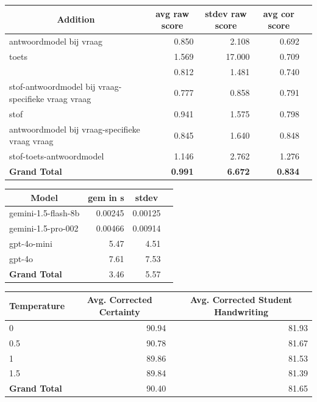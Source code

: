 \documentclass[12pt]{article}
\begin{document}
\noindent\begin{table}[h]\begin{tabularx}{\textwidth}{X *4{r}}
\toprule
\multicolumn{1}{c}{\textbf{Addition}} & \multicolumn{1}{c}{\textbf{avg raw score}} & \multicolumn{1}{c}{\textbf{stdev  raw  score}} & \multicolumn{1}{c}{\textbf{avg cor score}} \\
\midrule
antwoordmodel bij vraag & 0.850 & 2.108 & 0.692 \\
toets & 1.569 & 17.000 & 0.709 \\
 & 0.812 & 1.481 & 0.740 \\
stof-antwoordmodel bij vraag-specifieke vraag vraag & 0.777 & 0.858 & 0.791 \\
stof & 0.941 & 1.575 & 0.798 \\
antwoordmodel bij vraag-specifieke vraag vraag & 0.845 & 1.640 & 0.848 \\
stof-toets-antwoordmodel & 1.146 & 2.762 & 1.276 \\
\midrule
\textbf{Grand Total} & \textbf{0.991} & \textbf{6.672} & \textbf{0.834} \\
\bottomrule
\end{tabularx}%
\end{table}


\noindent\begin{table}[h]\begin{tabularx}{\textwidth}{X *3{r}}
\toprule
\multicolumn{1}{c}{\textbf{Model}} & \multicolumn{1}{c}{\textbf{gem in s}} & \multicolumn{1}{c}{\textbf{stdev}} \\
\midrule
gemini-1.5-flash-8b & 0.00245 & 0.00125 \\
gemini-1.5-pro-002 & 0.00466 & 0.00914 \\
gpt-4o-mini & 5.47 & 4.51 \\
gpt-4o & 7.61 & 7.53 \\
\midrule
\textbf{Grand Total} & 3.46 & 5.57 \\
\bottomrule
\end{tabularx}%
\end{table}

\noindent\begin{table}[h]
\begin{tabularx}{\textwidth}{X *{2}{r}}
\toprule
\multicolumn{1}{c}{\textbf{Temperature}} & \multicolumn{1}{c}{\textbf{Avg. Corrected Certainty}} & \multicolumn{1}{c}{\textbf{Avg. Corrected Student Handwriting}} \\
\midrule
0   & 90.94 & 81.93 \\
0.5 & 90.78 & 81.67 \\
1   & 89.86 & 81.53 \\
1.5 & 89.84 & 81.39 \\
\midrule
\textbf{Grand Total} & 90.40 & 81.65 \\
\bottomrule
\end{tabularx}
\end{table}
\end{document}
